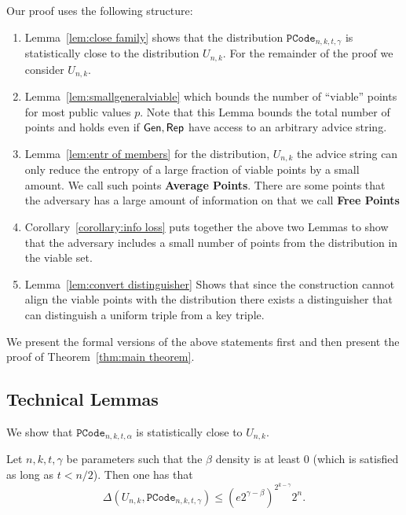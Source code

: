Our proof uses the following structure:
\begin{enumerate}

\item Lemma~\ref{lem:close family} shows that the distribution $\mathtt{PCode}_{n, k, t, \gamma}$ is statistically close to the distribution $U_{n,k}$.  For the remainder of the proof we consider $U_{n,k}$.
\item Lemma~\ref{lem:smallgeneralviable} which bounds the number of ``viable'' points for most public values $p$.  Note that this Lemma bounds the total number of points and holds even if ${\mathsf{Gen}}, {\mathsf{Rep}}$ have access to an arbitrary advice string. 

\item Lemma~\ref{lem:entr of members} for the distribution, $U_{n,k}$ the advice string can only reduce the entropy of a large fraction of viable points by a small amount. We call such points \textbf{Average Points}.  There are some points that the adversary has a large amount of information on that we call \textbf{Free Points}

\item Corollary~\ref{corollary:info loss} puts together the above two Lemmas to show that the adversary includes a small number of points from the distribution in the viable set.

\item Lemma~\ref{lem:convert distinguisher} Shows that since the construction cannot align the viable points with the distribution there exists a distinguisher that can distinguish a uniform triple from a key triple. 
\end{enumerate}

We present the formal versions of the above statements first and then present the proof of Theorem~\ref{thm:main theorem}.

\subsection{Technical Lemmas}
We show that $\mathtt{PCode}_{n, k, t, \alpha}$ is statistically close to $U_{n,k}$.

\begin{lemma}
 \label{lem:close family}
Let $n, k, t, \gamma$ be parameters such that the $\beta$ density is at least $0$ (which is satisfied as long as $t< n/2 $). Then one has that 
\[\Delta(U_{n,k}, \mathtt{PCode}_{n, k, t, \gamma}) \le \left(e2^{\gamma-\beta}\right)^{2^{k-\gamma}}2^n.\]
\end{lemma}

